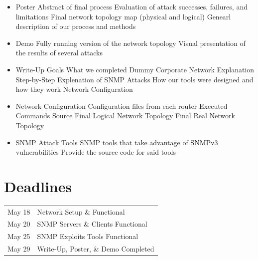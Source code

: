 \documentclass[pdftex, 11pt]{article}
\begin{document}
\begin{itemize}
\item Poster
  \subitem Abstract of final process
  \subitem Evaluation of attack successes, failures, and limitations
  \subitem Final network topology map (physical and logical)
  \subitem Genearl description of our process and methods

\item Demo
  \subitem Fully running version of the network topology %
  \subitem Visual presentation of the results of several attacks

\item Write-Up
  \subitem Goals
  \subitem What we completed
  \subitem Dummy Corporate Network Explanation
  \subitem Step-by-Step Explenation of SNMP Attacks
  \subitem How our tools were designed and how they work
  \subitem Network Configuration

\item Network Configuration
  \subitem Configuration files from each router
  \subitem Executed Commands Source
  \subitem Final Logical Network Topology
  \subitem Final Real Network Topology

\item SNMP Attack Tools
  \subitem SNMP tools that take advantage of SNMPv3  vulnerabilities
  \subitem Provide the source code for said tools

\end{itemize}

\section{Deadlines}

\begin{center}
\begin{tabular}{l l}
  May 18 & Network Setup \& Functional \\
  May 20 & SNMP Servers \& Clients Functional \\
  May 25 & SNMP Exploits Tools Functional \\
  May 29 & Write-Up, Poster, \& Demo Completed \\
\end{tabular}
\end{center}
\end{document}
